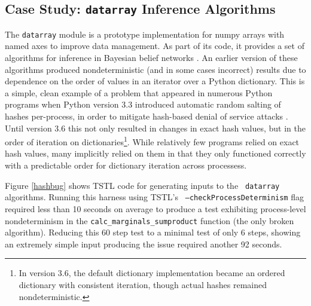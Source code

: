 \subsection{Case Study: {\tt datarray} Inference Algorithms}

The {\tt datarray} module \cite{datarray} is a prototype
implementation for numpy arrays with named axes to improve data
management.  As part of its code, it provides a set of algorithms for
inference in
Bayesian belief networks \cite{russell2016artificial}.  An earlier
version of these algorithms produced nondeterministic (and in some
cases incorrect) results due to dependence on the order of values in
an iterator over a Python dictionary.  This is a simple, clean example
of a problem that appeared in numerous Python programs when Python
version 3.3 introduced automatic random salting of hashes per-process,
in order to mitigate hash-based denial of service attacks
\cite{denial}.  Until version 3.6 this not only resulted in changes in
exact hash values, but in the order of iteration on
dictionaries\footnote{In version 3.6, the default dictionary
  implementation became an ordered dictionary with consistent
  iteration, though actual hashes remained nondeterministic.}.  While
relatively few programs relied on exact hash values, many implicitly
relied on them in that they only functioned correctly with a
predictable order for dictionary iteration across processess.

Figure \ref{hashbug} shows TSTL code for generating inputs to the {\tt
  datarray} algorithms.  Running this harness using TSTL's {\tt
  --checkProcessDeterminism} flag required less than 10 seconds on
average to produce a test exhibiting process-level nondeterminism in
the {\tt calc\_marginals\_sumproduct} function (the only broken
algorithm).  Reducing this 60 step test to a minimal test of only 6 steps,
showing an extremely simple input producing the issue 
required another 92 seconds.

